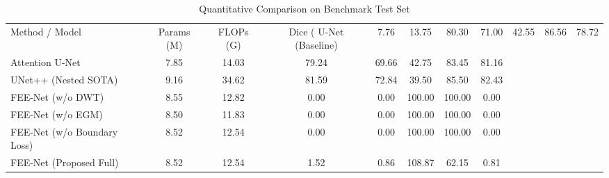 \begin{table}[htbp]
\centering
\caption{Quantitative Comparison on Benchmark Test Set}
\begin{tabular}{lccccccc}
\hline
Method / Model & Params (M) & FLOPs (G) & Dice (%
\hline
U-Net (Baseline) & 7.76 & 13.75 & 80.30 & 71.00 & 42.55 & 86.56 & 78.72 \\
Attention U-Net & 7.85 & 14.03 & 79.24 & 69.66 & 42.75 & 83.45 & 81.16 \\
UNet++ (Nested SOTA) & 9.16 & 34.62 & 81.59 & 72.84 & 39.50 & 85.50 & 82.43 \\
FEE-Net (w/o DWT) & 8.55 & 12.82 & 0.00 & 0.00 & 100.00 & 100.00 & 0.00 \\
FEE-Net (w/o EGM) & 8.50 & 11.83 & 0.00 & 0.00 & 100.00 & 100.00 & 0.00 \\
FEE-Net (w/o Boundary Loss) & 8.52 & 12.54 & 0.00 & 0.00 & 100.00 & 100.00 & 0.00 \\
FEE-Net (Proposed Full) & 8.52 & 12.54 & 1.52 & 0.86 & 108.87 & 62.15 & 0.81 \\
\hline
\end{tabular}
\end{table}